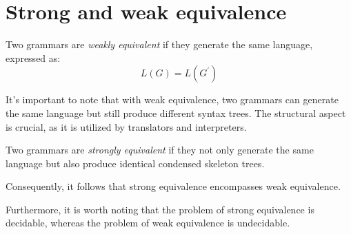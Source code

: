 \section{Strong and weak equivalence}

\begin{definition}
    Two grammars are \emph{weakly equivalent} if they generate the same language, expressed as:
    \[L(G)=L(G^{'})\]
\end{definition}
It's important to note that with weak equivalence, two grammars can generate the same language but still produce different syntax trees. 
The structural aspect is crucial, as it is utilized by translators and interpreters.
\begin{definition}
    Two grammars are \emph{strongly equivalent} if they not only generate the same language but also produce identical condensed skeleton trees.
\end{definition}
Consequently, it follows that strong equivalence encompasses weak equivalence.

Furthermore, it is worth noting that the problem of strong equivalence is decidable, whereas the problem of weak equivalence is undecidable.